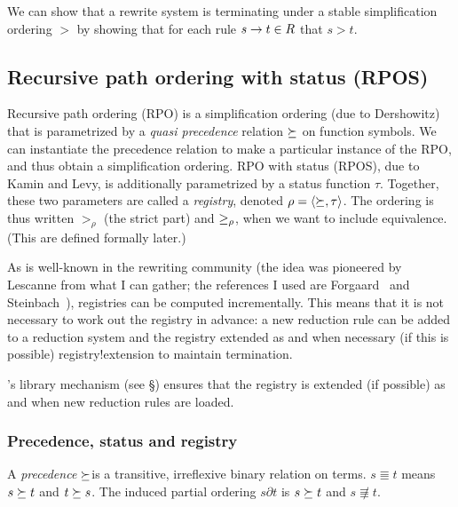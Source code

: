 We can show that a rewrite system is terminating under a stable
simplification ordering $\greater$ by showing that for each rule
$s\rightarrow t\in R$ that $s\greater t$.

\subsection {Recursive path ordering with status (RPOS)}

Recursive path ordering (RPO) is a simplification ordering (due to
Dershowitz) that is parametrized by a {\em quasi precedence\/}
relation $\quasi$ on function symbols.\index {$\quasi$} We
can instantiate the precedence relation to make a particular instance
of the RPO, and thus obtain a simplification ordering.  RPO with
status (RPOS), due to Kamin and Levy, is additionally parametrized by
a status function $\tau$. Together, these two parameters are called a
{\em registry}, denoted
$\rho=\langle\succeq,\tau\rangle$.  The ordering is thus written
$\greater_\rho$ (the strict part) and  $\geq_\rho$, when we
want to include equivalence.  (This are defined formally later.)

As is well-known in the rewriting community (the idea was pioneered by
Lescanne from what I can gather; the references I used are
Forgaard~\cite{Forgaard84} and Steinbach~\cite{Steinbach94}),
registries can be computed incrementally.  This means that it is not
necessary to work out the registry in advance: a new reduction rule can
be added to a reduction system and the registry extended as and when
necessary (if this is possible)\index
{registry!extension} to maintain termination.

\clam's library mechanism (see \S{}) ensures that the
registry is extended (if possible) as and when new reduction rules are
loaded.


\subsubsection {Precedence, status and registry}
\label{quasi-def}
\label{quasi-consistent}

A {\em precedence\/} $\quasi$is a transitive, irreflexive binary
relation on terms.  $s \Equiv t$ means $s\succeq t$ and $t\succeq s$.
The induced partial ordering $s\partial t$ is
$s \succeq t$ and $s\not\Equiv t$.  

